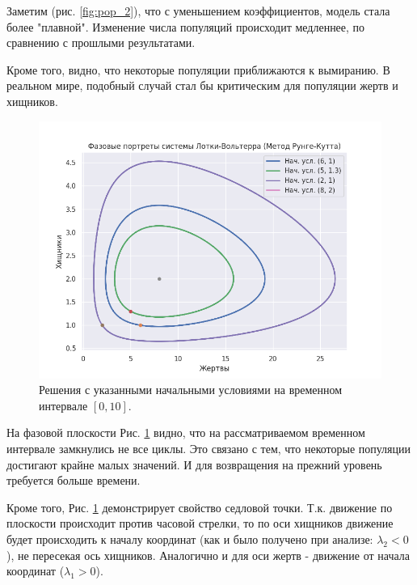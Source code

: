 Заметим (рис. \ref{fig:pop_2}), что с уменьшением коэффициентов, модель стала более "плавной". Изменение числа популяций происходит медленнее, по сравнению с прошлыми результатами. 

Кроме того, видно, что некоторые популяции приближаются к вымиранию. В реальном мире, подобный случай стал бы критическим для популяции жертв и хищников.

\begin{figure}[h]  %
	\centering
	\includegraphics[width=1\textwidth]{imgs/phase_2.png}  %
	\caption{Решения с указанными начальными условиями на временном интервале $[0,10]$.}  %
	\label{fig:phase_2}  %
\end{figure}

На фазовой плоскости Рис. \ref{fig:phase_2} видно, что на рассматриваемом временном интервале замкнулись не все циклы. 
Это связано с тем, что некоторые популяции достигают крайне малых значений. И для возвращения на прежний уровень требуется больше времени.

Кроме того, Рис. \ref{fig:phase_2} демонстрирует свойство седловой точки. Т.к. движение по плоскости происходит против часовой стрелки, то по оси хищников движение будет происходить к началу координат (как и было получено при анализе: $\lambda_2 < 0$), не пересекая ось хищников. Аналогично и для оси жертв - движение от начала координат ($\lambda_1 > 0$).